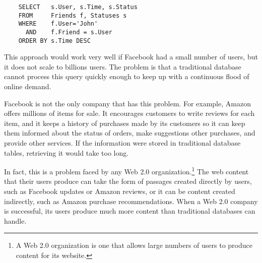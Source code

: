 \begin{verbatim}
	SELECT   s.User, s.Time, s.Status
	FROM     Friends f, Statuses s
	WHERE    f.User='John'
	  AND    f.Friend = s.User
	ORDER BY s.Time DESC
\end{verbatim}

This approach would work very well if Facebook had a small number of users,
but it does not scale to billions users.
The problem is that a traditional database cannot process
this query quickly enough to keep up with a continuous
flood of online demand.

Facebook is not the only company that has this problem.
For example, Amazon
offers millions of items for sale.
It encourages customers to write reviews for each item, and it keeps a history
of purchases made by its customers so it can keep them informed about the status of orders,
make suggestions other purchases, and provide other services.
If the information were stored in traditional database tables,
retrieving it would take too long.

In fact, this is a problem faced by any  
Web 2.0 organization.\footnote{A
Web 2.0 organization is one that allows large numbers 
of users to produce content for its website.}
The web content that their users produce 
can take the form of passages created directly by users,
such as Facebook updates or Amazon reviews, or it can be content created
indirectly, such as Amazon purchase recommendations.
When a Web 2.0 company is successful,
its users produce much more content than traditional databases can handle.

